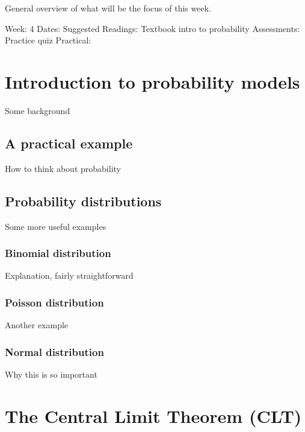 \documentclass[
]{book}
\begin{document}
General overview of what will be the focus of this week.

Week: 4
Dates:
Suggested Readings: Textbook intro to probability
Assessments: Practice quiz
Practical:

\hypertarget{introduction-to-probability-models}{%
\chapter{Introduction to probability models}\label{introduction-to-probability-models}}

Some background

\hypertarget{a-practical-example}{%
\section{A practical example}\label{a-practical-example}}

How to think about probability

\hypertarget{probability-distributions}{%
\section{Probability distributions}\label{probability-distributions}}

Some more useful examples

\hypertarget{binomial-distribution}{%
\subsection{Binomial distribution}\label{binomial-distribution}}

Explanation, fairly straightforward

\hypertarget{poisson-distribution}{%
\subsection{Poisson distribution}\label{poisson-distribution}}

Another example

\hypertarget{normal-distribution}{%
\subsection{Normal distribution}\label{normal-distribution}}

Why this is so important

\hypertarget{the-central-limit-theorem-clt}{%
\chapter{The Central Limit Theorem (CLT)}\label{the-central-limit-theorem-clt}}
\end{document}
